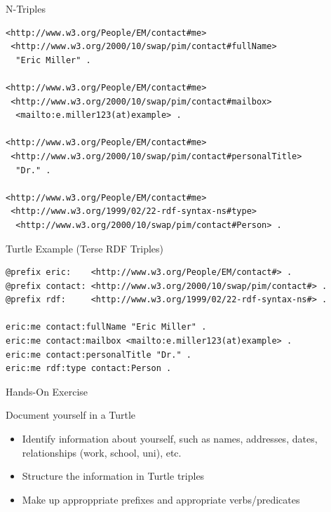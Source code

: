 \documentclass[ignorenonframetext,xcolor=x11names]{beamer}
\begin{document}
\begin{frame}[fragile]{N-Triples}
\scriptsize
\begin{verbatim}
<http://www.w3.org/People/EM/contact#me> 
 <http://www.w3.org/2000/10/swap/pim/contact#fullName> 
  "Eric Miller" .

<http://www.w3.org/People/EM/contact#me>
 <http://www.w3.org/2000/10/swap/pim/contact#mailbox> 
  <mailto:e.miller123(at)example> .

<http://www.w3.org/People/EM/contact#me>
 <http://www.w3.org/2000/10/swap/pim/contact#personalTitle> 
  "Dr." .
 
<http://www.w3.org/People/EM/contact#me>
 <http://www.w3.org/1999/02/22-rdf-syntax-ns#type>
  <http://www.w3.org/2000/10/swap/pim/contact#Person> .
\end{verbatim}
\end{frame}

\begin{frame}[fragile]{Turtle Example (Terse RDF Triples)}
\tiny
\begin{verbatim}
@prefix eric:    <http://www.w3.org/People/EM/contact#> .
@prefix contact: <http://www.w3.org/2000/10/swap/pim/contact#> .
@prefix rdf:     <http://www.w3.org/1999/02/22-rdf-syntax-ns#> .

eric:me contact:fullName "Eric Miller" .
eric:me contact:mailbox <mailto:e.miller123(at)example> .
eric:me contact:personalTitle "Dr." .
eric:me rdf:type contact:Person .
\end{verbatim}
\end{frame}

\begin{frame}{Hands-On Exercise}
\begin{block}{Document yourself in a Turtle}
\begin{itemize}
	\item Identify information about yourself, such as names, addresses, dates, relationships (work, school, uni), etc.
	\item Structure the information in Turtle triples
	\item Make up approppriate prefixes and appropriate verbs/predicates
\end{itemize}
\end{block}
\end{frame}
\end{document}
